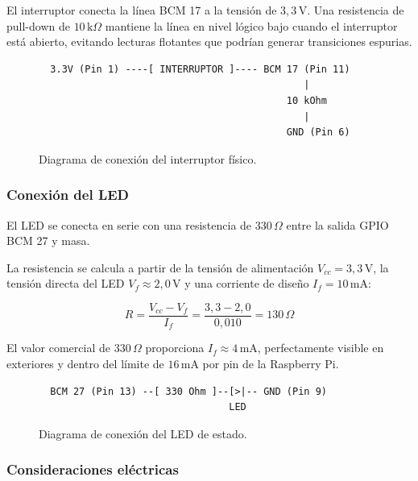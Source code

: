 El interruptor conecta la línea BCM 17 a la tensión de $3{,}3\,\mathrm{V}$.
Una resistencia de pull-down de $10\,\mathrm{k}\Omega$ mantiene la línea en
nivel lógico bajo cuando el interruptor está abierto, evitando lecturas
flotantes que podrían generar transiciones espurias.

\begin{figure}[H]
\centering
\begin{verbatim}
  3.3V (Pin 1) ----[ INTERRUPTOR ]---- BCM 17 (Pin 11)
                                              |
                                           10 kOhm
                                              |
                                           GND (Pin 6)
\end{verbatim}
\caption{Diagrama de conexión del interruptor físico.}
\label{fig:switch-wiring}
\end{figure}

\subsubsection{Conexión del LED}

El LED se conecta en serie con una resistencia de $330\,\Omega$ entre la
salida GPIO BCM 27 y masa.

La resistencia se calcula a partir de la tensión de alimentación
$V_{cc} = 3{,}3\,\mathrm{V}$, la tensión directa del LED
$V_f \approx 2{,}0\,\mathrm{V}$ y una corriente de diseño
$I_f = 10\,\mathrm{mA}$:

\begin{equation}
  R = \frac{V_{cc} - V_f}{I_f} = \frac{3{,}3 - 2{,}0}{0{,}010} = 130\,\Omega
\end{equation}

El valor comercial de $330\,\Omega$ proporciona
$I_f \approx 4\,\mathrm{mA}$, perfectamente visible en exteriores y dentro
del límite de $16\,\mathrm{mA}$ por pin de la Raspberry Pi.

\begin{figure}[H]
\centering
\begin{verbatim}
  BCM 27 (Pin 13) --[ 330 Ohm ]--[>|-- GND (Pin 9)
                                 LED
\end{verbatim}
\caption{Diagrama de conexión del LED de estado.}
\label{fig:led-wiring}
\end{figure}

\subsubsection{Consideraciones eléctricas}

